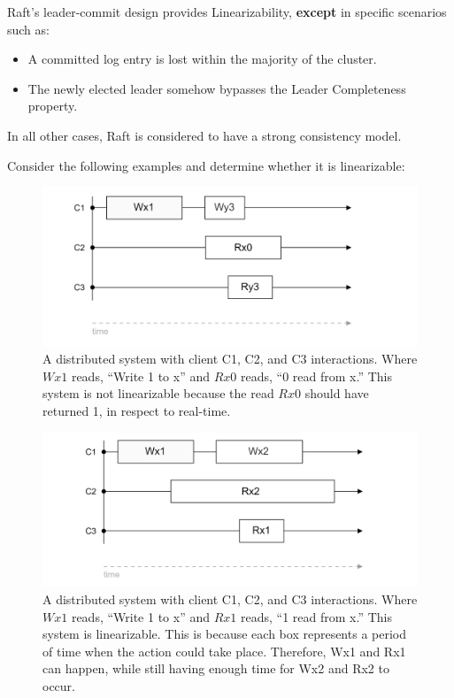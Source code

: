 \vspace{-.5em}
\begin{theo}
    
    Raft's leader-commit design provides Linearizability, \textbf{except} in specific scenarios such as:
    \begin{itemize}
        \item A committed log entry is lost within the majority of the cluster.
        \item The newly elected leader somehow bypasses the Leader Completeness property.
    \end{itemize}

    \noindent
    In all other cases, Raft is considered to have a strong consistency model.
\end{theo}

\newpage

\noindent
Consider the following examples and determine whether it is linearizable:

\begin{figure}[h]
    \centering
    \includegraphics[width=\textwidth]{Sections/consist/lin1.png}
    \caption{A distributed system with client C1, C2, and C3 interactions. Where $Wx1$ reads, ``Write 1 to x'' and $Rx0$ reads, ``0 read from x.'' This 
    system is not linearizable because the read $Rx0$ should have returned 1, in respect to real-time.}
\end{figure}

\begin{figure}[h]
    \centering
    \includegraphics[width=\textwidth]{Sections/consist/lin2.png}
    \caption{A distributed system with client C1, C2, and C3 interactions. Where $Wx1$ reads, ``Write 1 to x'' and $Rx1$ reads, ``1 read from x.'' This
    system is linearizable. This is because each box represents a period of time when the action could take place. Therefore, Wx1 and Rx1 can happen, while still having enough time for Wx2 and Rx2 to occur.}
    \label{fig:my_label}
\end{figure}

